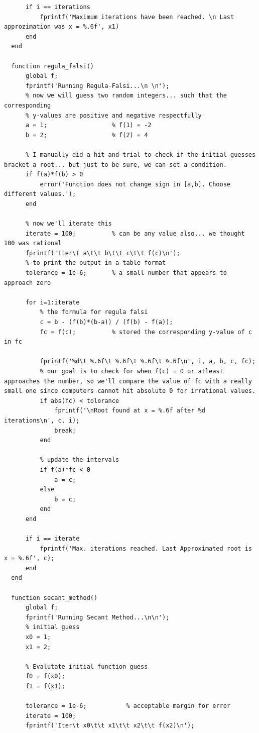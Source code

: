 \documentclass[12pt]{report}
\begin{document}
\begin{lstlisting}
      if i == iterations
          fprintf('Maximum iterations have been reached. \n Last approzimation was x = %.6f', x1)
      end
  end

  function regula_falsi()
      global f;
      fprintf('Running Regula-Falsi...\n \n');
      % now we will guess two random integers... such that the corresponding
      % y-values are positive and negative respectfully
      a = 1;                  % f(1) = -2
      b = 2;                  % f(2) = 4
      
      % I manually did a hit-and-trial to check if the initial guesses bracket a root... but just to be sure, we can set a condition.
      if f(a)*f(b) > 0
          error('Function does not change sign in [a,b]. Choose different values.');
      end
      
      % now we'll iterate this
      iterate = 100;          % can be any value also... we thought 100 was rational
      fprintf('Iter\t a\t\t b\t\t c\t\t f(c)\n');
      % to print the output in a table format
      tolerance = 1e-6;       % a small number that appears to approach zero
      
      for i=1:iterate
          % the formula for regula falsi
          c = b - (f(b)*(b-a)) / (f(b) - f(a));
          fc = f(c);          % stored the corresponding y-value of c in fc
      
          fprintf('%d\t %.6f\t %.6f\t %.6f\t %.6f\n', i, a, b, c, fc);
          % our goal is to check for when f(c) = 0 or atleast approaches the number, so we'll compare the value of fc with a really small one since computers cannot hit absolute 0 for irrational values.
          if abs(fc) < tolerance
              fprintf('\nRoot found at x = %.6f after %d iterations\n', c, i);
              break;
          end
      
          % update the intervals
          if f(a)*fc < 0
              a = c;
          else
              b = c;
          end
      end
      
      if i == iterate
          fprintf('Max. iterations reached. Last Approximated root is x = %.6f', c);
      end
  end

  function secant_method()
      global f;
      fprintf('Running Secant Method...\n\n');
      % initial guess
      x0 = 1;
      x1 = 2;
      
      % Evalutate initial function guess
      f0 = f(x0);
      f1 = f(x1);
      
      tolerance = 1e-6;           % acceptable margin for error
      iterate = 100;
      fprintf('Iter\t x0\t\t x1\t\t x2\t\t f(x2)\n');
      

\end{lstlisting}
\end{document}
